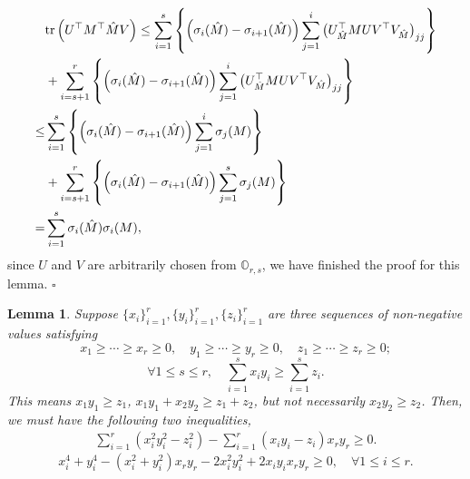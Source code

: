 \documentclass[11pt]{article}
\newtheorem{Lemma}{Lemma}
\newcommand{\0}{{\mathbf{0}}}
\newcommand{\1}{{\mathbf{1}}}
\newcommand{\tr}{{\rm tr}}
\begin{document}
\begin{equation*}
\begin{split}
& \tr\left(U^\top M^\top \hat{M}V\right) \leq  \sum_{i=1}^s\left\{\left(\sigma_i(\hat{M}) - \sigma_{i+1}(\hat{M})\right) \sum_{j=1}^i \left(U_{\hat{M}}^\top M U V^\top V_{\hat{M}}\right)_{jj}\right\}\\
& + \sum_{i=s+1}^r\left\{\left(\sigma_i(\hat{M}) - \sigma_{i+1}(\hat{M})\right) \sum_{j=1}^i \left(U_{\hat{M}}^\top M U V^\top V_{\hat{M}}\right)_{jj}\right\}\\
\leq & \sum_{i=1}^s\left\{\left(\sigma_i(\hat{M}) - \sigma_{i+1}(\hat{M})\right) \sum_{j=1}^i \sigma_j(M)\right\}\\ 
& + \sum_{i=s+1}^r\left\{\left(\sigma_i(\hat{M}) - \sigma_{i+1}(\hat{M})\right) \sum_{j=1}^s \sigma_j(M) \right\}\\ 
= & \sum_{i=1}^s \sigma_i(\hat{M})\sigma_i(M),
\end{split}
\end{equation*}
since $U$ and $V$ are arbitrarily chosen from $\mathbb{O}_{r, s}$, we have finished the proof for this lemma. \quad $\square$


\begin{Lemma}\label{lm:inequality}
	Suppose $\{x_i\}_{i=1}^r, \{y_i\}_{i=1}^r, \{z_i\}_{i=1}^r$ are three sequences of non-negative values satisfying
	$$x_1\geq \cdots\geq x_r\geq 0, \quad y_1\geq \cdots \geq y_r \geq 0, \quad z_1\geq \cdots \geq z_r\geq 0;$$ 
	$$\forall 1\leq s\leq r, \quad \sum_{i=1}^s x_iy_i \geq \sum_{i=1}^s z_i. $$
	This means $x_1y_1\geq z_1$, $x_1y_1+x_2y_2\geq z_1+z_2$, but not necessarily $x_2y_2\geq z_2$. Then, we must have the following two inequalities,
	\begin{equation*}
	\begin{split}
	\sum_{i=1}^r \left(x_i^2y_i^2 - z_i^2\right) - \sum_{i=1}^r (x_iy_i - z_i) x_ry_r \geq 0.
	\end{split}
	\end{equation*}
	\begin{equation*}
	x_i^4 + y_i^4 - (x_i^2 + y_i^2)x_ry_r - 2x_i^2y_i^2 + 2x_iy_ix_ry_r \geq 0,\quad \forall 1\leq i \leq r.
	\end{equation*}
\end{Lemma}
\end{document}
